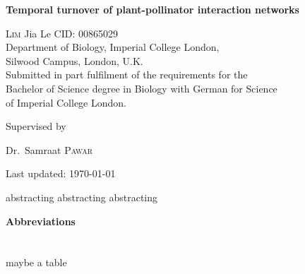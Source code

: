 \documentclass[12pt]{article}
\renewenvironment{abstract}
 {\hspace{.8cm}
  {\bfseries\huge\abstractname}
  \list{}{
    \setlength{\leftmargin}{.95cm}%
    \setlength{\rightmargin}{\leftmargin}%
  }%
  \item\relax}
 {\endlist}
\begin{document}
\begin{titlepage}
	\centering
	\vspace*{\fill}
	{\huge\bfseries Temporal turnover of plant-pollinator interaction networks \par}
	\vspace{2cm}
	{\Large \textsc{Lim} Jia Le  {    }  CID: 00865029}
	\\ 	\vspace{0.5cm}
	{Department of Biology, Imperial College London, \\Silwood Campus, London, U.K.} \\ \vspace{0.5cm}
	{Submitted in part fulfilment of the requirements for the \\ Bachelor of Science degree in Biology with German for Science \\ of Imperial College London.} \\
	\vspace*{\fill}
	{\large Supervised by\par
	Dr.~Samraat \textsc{Pawar}}
	\vfill
	{\large Last updated: \today\par}
\end{titlepage}



\newpage
{}
\vspace*{\fill}
\begin{abstract}  
\doublespacing
abstracting abstracting abstracting

\end{abstract}
\vfill

\newpage
{}
\vspace*{\fill}
\tableofcontents 
\vspace*{\fill} 
\thispagestyle{empty}

\doublespacing

\newpage 
\vspace*{\fill}
{\huge\bfseries Abbreviations} \\
\\
\\
\large{maybe a table}
\vfill
\end{document}
